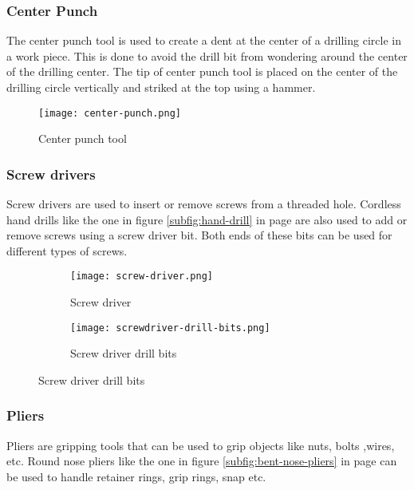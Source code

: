 \documentclass[a4paper,12pt]{article}
\begin{document}
				\subsubsection*{Center Punch}
					The center punch tool is used to create a dent at the center of a drilling circle in a work piece.
					This is done to avoid the drill bit from wondering around the center of the drilling center.
					The tip of center punch tool is placed on the center of the drilling circle vertically and striked at the top using a hammer.  
						\begin{figure}[H]
							\centering				
								\texttt{[image: center-punch.png]}
							\caption{Center punch tool}
							\label{fig:center-punch}
						\end{figure}				
				
				\newpage
				\subsubsection*{Screw drivers}
					Screw drivers are used to insert or remove screws from a threaded hole.
					Cordless hand drills like the one in figure \ref{subfig:hand-drill} in page \pageref{subfig:hand-drill} are also used to add or remove screws using a screw driver bit.
					Both ends of these bits can be used for different types of screws.
						\begin{figure}[H]
							\begin{subfigure}{0.5\linewidth}				
								\centering				
								\texttt{[image: screw-driver.png]}
								\caption{Screw driver}
								\label{subfig:screw-driver}
							\end{subfigure}						
							\hfill
							\begin{subfigure}{0.5\linewidth}
								\centering
								\texttt{[image: screwdriver-drill-bits.png]}
								\caption{Screw driver drill bits}														\label{subfig:screwdriver-drill-bits}
							\end{subfigure}
						\end{figure}
						
				\subsubsection*{Pliers}
				
				Pliers are gripping tools that can be used to grip objects like nuts, bolts ,wires, etc.
				Round nose pliers like the one in figure \ref{subfig:bent-nose-pliers} in page \pageref{subfig:bent-nose-pliers} can be used to handle retainer rings, grip rings, snap etc. 
				
\end{document}
